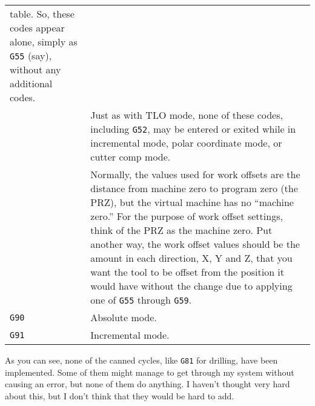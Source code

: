 \documentclass[titlepage,oneside,10pt]{article}
\begin{document}
\begin{longtable}{lp{10cm}}
table. So, these codes appear alone, simply as {\tt G55} (say),
without any additional codes.\\
&Just as with TLO mode, none of these codes, including {\tt G52}, may be
entered or exited while in incremental mode, polar coordinate mode, or
cutter comp mode.\\
&Normally, the values used for work offsets are the distance from
machine zero to program zero (the PRZ), but the virtual machine has no
``machine zero.'' For the purpose of work offset settings, think of
the PRZ as the machine zero. Put another way, the work offset values
should be the amount in each direction, X, Y and Z, that you want the
tool to be offset from the position it would have without the change
due to applying one of {\tt G55} through {\tt G59}.\\
{\tt G90}&Absolute mode.\\
{\tt G91}&Incremental mode.
\end{longtable}
\vskip 0.50cm
As you can see, none of the canned cycles, like {\tt G81} for
drilling, have been implemented. Some of them might manage to get
through my system without causing an error, but none of them do
anything. I haven't thought very hard about this, but I don't think that
they would be hard to add.
\end{document}
